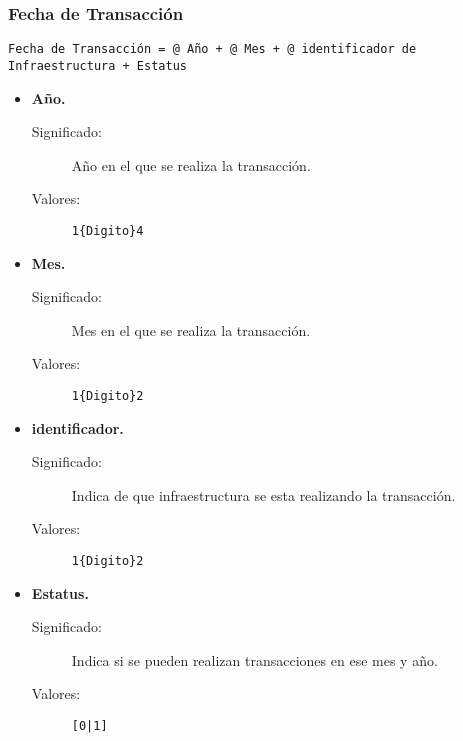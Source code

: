 \subsubsection{Fecha de Transacción}\label{Fecha_Transaccion}
\begin{lstlisting}
Fecha de Transacción = @ Año + @ Mes + @ identificador de Infraestructura + Estatus
\end{lstlisting}
\lstset{breaklines=true}
	\begin{itemize}
		\item \textbf{Año.}
			\begin{description}
				\item [Significado:] Año en el que se realiza la transacción.
				\item [Valores:]{\begin{lstlisting}
1{Digito}4\end{lstlisting}}
			\end{description}

		\item \textbf{Mes.}
			\begin{description}
				\item [Significado:] Mes en el que se realiza la transacción.
				\item [Valores:]{\begin{lstlisting}
1{Digito}2\end{lstlisting}}
			\end{description}
		\item \textbf{identificador.}
			\begin{description}
				\item [Significado:] Indica de que infraestructura se esta realizando la transacción.
				\item [Valores:]{\begin{lstlisting}
1{Digito}2\end{lstlisting}}
			\end{description}
		\item \textbf{Estatus.}
			\begin{description}
				\item [Significado:] Indica si se pueden realizan transacciones en ese mes y año.
				\item [Valores:]{\begin{lstlisting}
[0|1]\end{lstlisting}}
			\end{description}
	\end{itemize}
